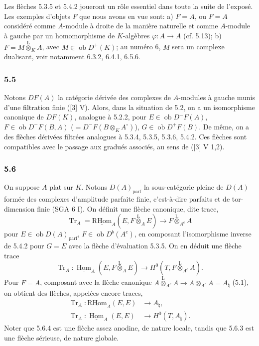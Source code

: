 \documentclass[11pt]{article}
\DeclareMathOperator{\Hom}{Hom}
\newcommand{\ob}{\operatorname{ob}}
\providecommand{\RHom}{\mathrm{RHom}}
\providecommand{\uRHom}{\underline{\RHom}}
\providecommand{\uHom}{\underline{\Hom}}
\providecommand{\Tr}{\operatorname{Tr}}
\providecommand{\Tr}{\operatorname{Tr}}
\providecommand{\lten}{\overset{\mathrm L}{\otimes}}
\providecommand{\Tr}{\operatorname{Tr}}
\providecommand{\RHom}{\mathrm{RHom}}
\providecommand{\Hom}{\operatorname{Hom}}
\providecommand{\ob}{\operatorname{ob}}
\providecommand{\lten}{\overset{\mathrm L}{\otimes}}
\providecommand{\RHom}{\mathrm R\mathcal{H}om}
\providecommand{\lten}{\overset{\mathrm L}{\otimes}}
\providecommand{\Tr}{\operatorname{Tr}}
\providecommand{\lten}{\overset{\mathrm L}{\otimes}}
\providecommand{\lten}{\overset{\mathrm L}{\otimes}}
\providecommand{\lten}{\overset{\mathrm L}{\otimes}}
\providecommand{\RHom}{\mathrm{RHom}}
\providecommand{\Hom}{\operatorname{Hom}}
\providecommand{\Tr}{\operatorname{Tr}}
\providecommand{\lten}{\overset{\mathrm L}{\otimes}}
\begin{document}
Les flèches 5.3.5 et 5.4.2 joueront un rôle essentiel dans toute la suite de l'exposé. Les exemples d'objets $F$ que nous avons en vue sont: a) $F=A$, ou $F=A$ considéré comme $A$-module à droite de la manière naturelle et comme $A$-module à gauche par un homomorphisme de $K$-algèbres $\varphi:A\to A$ (cf. 5.13); b) $F=M\lten_KA$, avec $M\in\ob D^+(K)$; au numéro 6, $M$ sera un complexe dualisant, voir notamment 6.3.2, 6.4.1, 6.5.6.

\subsubsection*{5.5}

Notons $DF(A)$ la catégorie dérivée des complexes de $A$-modules à gauche munis d'une filtration finie ([3] V). Alors, dans la situation de 5.2, on a un isomorphisme canonique de $DF(K)$, analogue à 5.2.2, pour $E\in\ob D^-F(A)$, $F\in\ob D^-F(B,A)$ ($=D^-F(B\otimes_KA^\circ)$), $G\in\ob D^+F(B)$. De même, on a des flèches dérivées filtrées analogues à 5.3.4, 5.3.5, 5.3.6, 5.4.2. Ces flèches sont compatibles avec le passage aux gradués associés, au sens de ([3] V 1,2).

\subsubsection*{5.6}

On suppose $A$ plat sur $K$. Notons $D(A)_{\mathrm{parf}}$ la sous-catégorie pleine de $D(A)$ formée des complexes d'amplitude parfaite finie, c'est-à-dire parfaits et de tor-dimension finie (SGA 6 I). On définit une flèche canonique, dite trace,
\begin{equation}\tag{5.6.1}
\Tr_A=\uRHom_A(E,F\lten_AE)\longrightarrow F\lten_{A^e}A
\end{equation}
pour $E\in\ob D(A)_{\mathrm{parf}}$, $F\in\ob D^b(A^e)$, en composant l'isomorphisme inverse de 5.4.2 pour $G=E$ avec la flèche d'évaluation 5.3.5. On en déduit une flèche trace
\begin{equation}\tag{5.6.2}
\Tr_A:\uHom_A(E,F\lten_AE)\longrightarrow H^0(T,F\lten_{A^e}A).
\end{equation}
Pour $F=A$, composant avec la flèche canonique $A\lten_{A^e}A\to A\otimes_{A^e}A=A_\natural$ (5.1), on obtient des flèches, appelées encore traces,
\begin{align}
\Tr_A:\uRHom_A(E,E)&\longrightarrow A_\natural,\tag{5.6.3}\\
\Tr_A:\uHom_A(E,E)&\longrightarrow H^0(T,A_\natural).\tag{5.6.4}
\end{align}
Noter que 5.6.4 est une flèche assez anodine, de nature locale, tandis que 5.6.3 est une flèche sérieuse, de nature globale.
\end{document}
